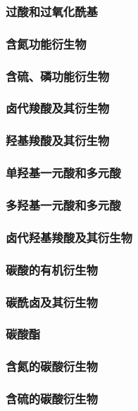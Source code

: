 \documentclass[UTF8]{../03-Chemistry}
\begin{document}
        \subsubsection{过酸和过氧化酰基}
        \subsubsection{含氮功能衍生物}
        \subsubsection{含硫、磷功能衍生物}
    \subsubsection{卤代羧酸及其衍生物}
    \subsubsection{羟基羧酸及其衍生物}
        \subsubsection{单羟基一元酸和多元酸}
        \subsubsection{多羟基一元酸和多元酸}
        \subsubsection{卤代羟基羧酸及其衍生物}
    \subsubsection{碳酸的有机衍生物}
        \subsubsection{碳酰卤及其衍生物}
        \subsubsection{碳酸酯}
        \subsubsection{含氮的碳酸衍生物}
        \subsubsection{含硫的碳酸衍生物}
\end{document}
